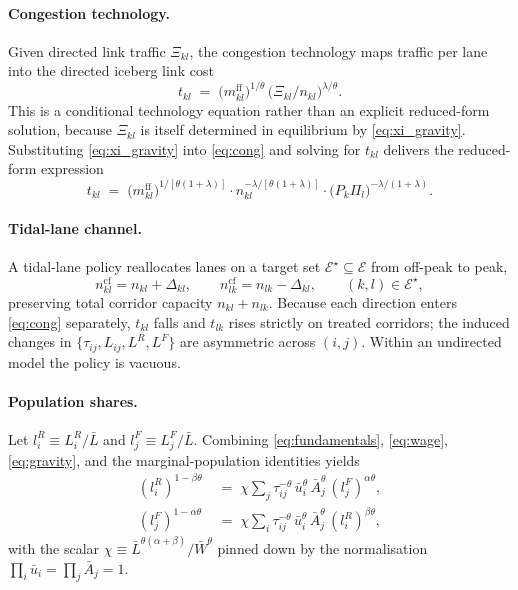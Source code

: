 \documentclass[12pt]{article}
\newcommand{\E}{\mathcal E}
\newcommand{\Lbar}{\bar L}
\newcommand{\Wbar}{\bar W}
\newcommand{\ubar}{\bar u}
\newcommand{\Abar}{\bar A}
\newcommand{\tbar}{m^{\mathrm{ff}}}
\newcommand{\tkl}{t_{kl}}
\newcommand{\tijk}{\tau_{ij}}
\newcommand{\cf}{\mathrm{cf}}
\begin{document}
\paragraph{Congestion technology.}
Given directed link traffic $\Xi_{kl}$, the congestion technology
maps traffic per lane into the directed iceberg link cost
\begin{equation}
  \tkl
  \;=\;
  \bigl(\tbar_{kl}\bigr)^{1/\theta}\,
  \bigl(\Xi_{kl}/n_{kl}\bigr)^{\lambda/\theta}.
  \label{eq:cong}
\end{equation}
This is a conditional technology equation rather than an explicit
reduced-form solution, because $\Xi_{kl}$ is itself determined in
equilibrium by \eqref{eq:xi_gravity}.  Substituting
\eqref{eq:xi_gravity} into \eqref{eq:cong} and solving
for $\tkl$ delivers the reduced-form expression
\begin{equation}
  \tkl
  \;=\;
  \bigl(\tbar_{kl}\bigr)^{1/[\theta(1+\lambda)]}\cdot
  n_{kl}^{-\lambda/[\theta(1+\lambda)]}\cdot
  \bigl(P_k\Pi_l\bigr)^{-\lambda/(1+\lambda)}.
  \label{eq:tkl_reduced}
\end{equation}

\paragraph{Tidal-lane channel.}
A tidal-lane policy reallocates lanes on a target set
$\E^{\star}\subseteq\E$ from off-peak to peak,
\begin{equation}
  n_{kl}^{\cf}=n_{kl}+\Delta_{kl},\qquad
  n_{lk}^{\cf}=n_{lk}-\Delta_{kl},\qquad
  (k,l)\in\E^{\star},
\end{equation}
preserving total corridor capacity $n_{kl}+n_{lk}$.  Because each
direction enters \eqref{eq:cong} separately, $\tkl$ falls and
$t_{lk}$ rises strictly on treated corridors; the induced changes in
$\{\tijk,L_{ij},L^R,L^F\}$ are asymmetric across $(i,j)$.  Within an
undirected model the policy is vacuous.

\paragraph{Population shares.}
Let $l_i^R\equiv L_i^R/\Lbar$ and $l_j^F\equiv L_j^F/\Lbar$.
Combining \eqref{eq:fundamentals}, \eqref{eq:wage},
\eqref{eq:gravity}, and the marginal-population identities yields
\begin{align}
  (l_i^R)^{1-\beta\theta}
  &\;=\;\chi\sum_{j}\tijk^{-\theta}\,\ubar_i^{\theta}\,\Abar_j^{\theta}\,
       (l_j^F)^{\alpha\theta},
  \label{eq:eq_R}\\
  (l_j^F)^{1-\alpha\theta}
  &\;=\;\chi\sum_{i}\tijk^{-\theta}\,\ubar_i^{\theta}\,\Abar_j^{\theta}\,
       (l_i^R)^{\beta\theta},
  \label{eq:eq_F}
\end{align}
with the scalar $\chi\equiv\Lbar^{\theta(\alpha+\beta)}/\Wbar^{\theta}$
pinned down by the normalisation
$\prod_i\ubar_i=\prod_j\Abar_j=1$.
\end{document}
